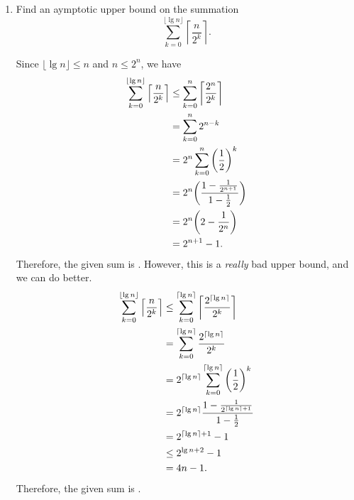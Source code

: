 \documentclass[AppendixA]{subfiles}
\begin{document}
\begin{enumerate}[leftmargin=\labelsep]
		\item Find an aymptotic upper bound on the summation
		\[
			\sum_{k = 0}^{\lfloor \lg n \rfloor} \left\lceil \frac{n}{2^k} \right\rceil.
		\]
		\begin{answer}
			Since $\lfloor \lg n \rfloor \leq n$ and $n \leq 2^n$, we have
			\begin{align*}
				\sum_{k = 0}^{\lfloor \lg n \rfloor} \left\lceil \frac{n}{2^k} \right\rceil &\leq \sum_{k = 0}^n \left\lceil \frac{2^n}{2^k} \right\rceil\\
					&= \sum_{k = 0}^n 2^{n - k}\\
					&= 2^n \sum_{k = 0}^n \qty(\frac{1}{2})^k\\
					&= 2^n \qty(\frac{1 - \frac{1}{2^{n + 1}}}{1 - \frac{1}{2}})\\
					&= 2^n \qty(2 - \frac{1}{2^{n}})\\
					&= 2^{n + 1} - 1.
			\end{align*}
			Therefore, the given sum is . However, this is a \emph{really} bad upper bound, and we can do better.
			\begin{align*}
				\sum_{k = 0}^{\lfloor \lg n \rfloor} \left\lceil \frac{n}{2^k} \right\rceil &\leq \sum_{k = 0}^{\lceil \lg n \rceil} \left\lceil \frac{2^{\lceil \lg n \rceil}}{2^k} \right\rceil\\
					&= \sum_{k = 0}^{\lceil \lg n \rceil} \frac{2^{\lceil \lg n \rceil}}{2^k}\\
					&= 2^{\lceil \lg n \rceil} \sum_{k = 0}^{\lceil \lg n \rceil} \qty(\frac{1}{2})^k\\
					&= 2^{\lceil \lg n \rceil} \frac{1 - \frac{1}{2^{\lceil \lg n \rceil + 1}}}{1 - \frac{1}{2}}\\
					&= 2^{\lceil \lg n \rceil + 1} - 1\\
					&\leq 2^{\lg n + 2} - 1\\
					&= 4n - 1.
			\end{align*}
			Therefore, the given sum is .
		\end{answer}
		

\end{enumerate}
\end{document}
